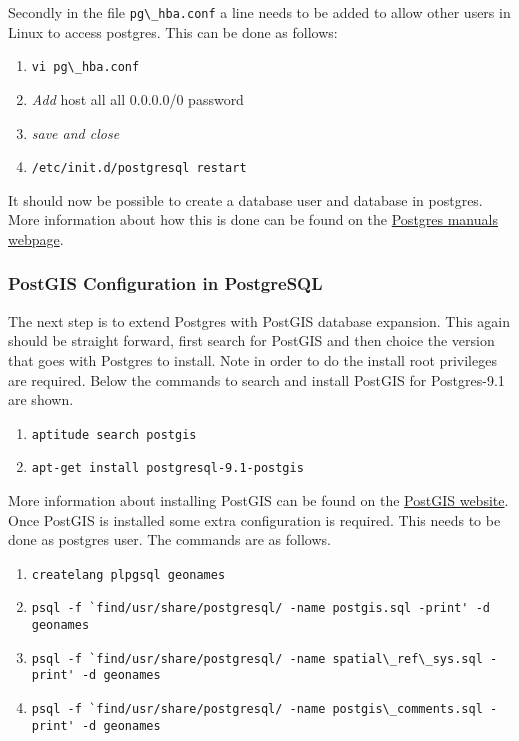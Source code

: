 \noindent Secondly in the file \lstinline$pg\_hba.conf$ a line needs to be added to allow other users in Linux to access postgres. This can be done as follows:

\begin{enumerate}[resume]
	\item \lstinline$vi pg\_hba.conf$
	\item \textit{Add} host all	all 0.0.0.0/0 password
	\item \textit{save and close}
	\item \lstinline$/etc/init.d/postgresql restart$
\end{enumerate}

\noindent It should now be possible to create a database user and database in postgres. More information about how this is done can be found on the \href{http://www.postgresql.org/docs/manuals/}{Postgres manuals webpage}.

\subsubsection{PostGIS Configuration in PostgreSQL}
The next step is to extend Postgres with PostGIS database expansion. This again should be straight forward, first search for PostGIS and then choice the version that goes with Postgres to install. Note in order to do the install root privileges are required. Below the commands to search and install PostGIS for Postgres-9.1 are shown.

\begin{enumerate}
	\item \lstinline$aptitude search postgis$
	\item \lstinline$apt-get install postgresql-9.1-postgis$
\end{enumerate} 

\noindent More information about installing PostGIS  can be found on the \href{http://www.postgis.net/install}{PostGIS website}.
\newline
\newline
Once PostGIS is installed some extra configuration is required. This needs to be done as postgres user. The commands are as follows.

\begin{enumerate}	
	\item \lstinline$createlang plpgsql geonames$
	\item \lstinline$psql -f `find/usr/share/postgresql/ -name postgis.sql -print' -d geonames$
	\item \lstinline$psql -f `find/usr/share/postgresql/ -name spatial\_ref\_sys.sql -print' -d geonames$
	\item \lstinline$psql -f `find/usr/share/postgresql/ -name postgis\_comments.sql -print' -d geonames$
\end{enumerate}

